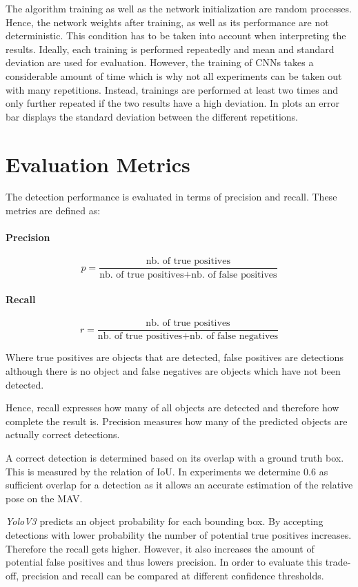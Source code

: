 The algorithm training as well as the network initialization are random processes. Hence, the network weights after training, as well as its performance are not deterministic. This condition has to be taken into account when interpreting the results. Ideally, each training is performed repeatedly and mean and standard deviation are used for evaluation. However, the training of \acp{CNN} takes a considerable amount of time which is why not all experiments can be taken out with many repetitions. Instead, trainings are performed at least two times and only further repeated if the two results have a high deviation. In plots an error bar displays the standard deviation between the different repetitions.


\section{Evaluation Metrics}
\label{sec:background:metrics}
The detection performance is evaluated in terms of precision and recall. These metrics are defined as:

\paragraph{Precision}
$$p = \frac{\text{nb. of true positives}}{\text{nb. of true positives} + \text{nb. of false positives}}$$

\paragraph{Recall}
$$r = \frac{\text{nb. of true positives}}{\text{nb. of true positives} + \text{nb. of false negatives}}$$

Where true positives are objects that are detected, false positives are detections although there is no object and false negatives are objects which have not been detected.

Hence, recall expresses how many of all objects are detected and therefore how complete the result is. Precision measures how many of the predicted objects are actually correct detections.

A correct detection is determined based on its overlap with a ground truth box. This is measured by the relation of \ac{IoU}. In experiments we determine 0.6 as sufficient overlap for a detection as it allows an accurate estimation of the relative pose on the \ac{MAV}.

\textit{YoloV3} predicts an object probability for each bounding box. By accepting detections with lower probability the number of potential true positives increases. Therefore the recall gets higher. However, it also increases the amount of potential false positives and thus lowers precision. In order to evaluate this trade-off, precision and recall can be compared at different confidence thresholds.


